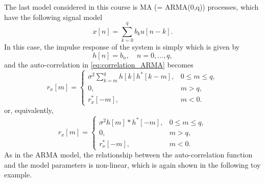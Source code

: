 The last model considered in this course is MA (= ARMA(0,q)) processes, which have the following signal model
\begin{equation}
\label{eq:signal_model_MA}
x[n]  = \sum_{k = 0}^{q} b_k u[n-k].
\end{equation}
In this case, the impulse response of the system is simply which is given by
\begin{equation}
h[n] = b_n, \quad n = 0, \ldots, q,
\end{equation}
and the auto-correlation in \eqref{eq:correlation_ARMA} becomes
\begin{equation}
r_{x}[m] = \begin{cases}
\displaystyle \sigma^2  \sum_{k = m}^{q} h[k]  h^{\ast}[k-m], & 0 \leq  m \leq q, \\ 
0, & m > q, \\
r_{x}^{\ast}[-m], & m < 0.
\end{cases}
\end{equation}
or, equivalently,
\begin{equation}
\label{eq:correlation_MA}
r_{x}[m] = \begin{cases}
\displaystyle \sigma^2  h[m] \ast  h^{\ast}[-m], & 0 \leq  m \leq q, \\ 
0, & m > q, \\
r_{x}^{\ast}[-m], & m < 0.
\end{cases}
\end{equation}
As in the ARMA model, the relationship between the auto-correlation function and the model parameters is non-linear, which is again shown in the following toy example.

